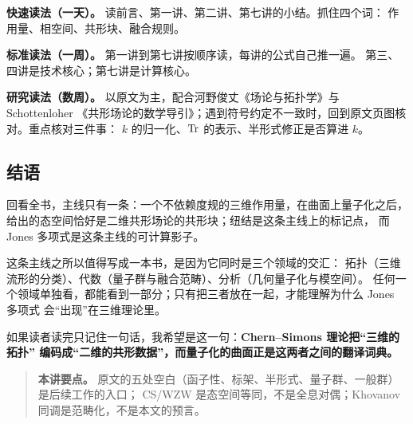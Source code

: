 \textbf{快速读法（一天）。} 读前言、第一讲、第二讲、第七讲的小结。抓住四个词：
作用量、相空间、共形块、融合规则。

\textbf{标准读法（一周）。} 第一讲到第七讲按顺序读，每讲的公式自己推一遍。
第三、四讲是技术核心；第七讲是计算核心。

\textbf{研究读法（数周）。} 以原文为主，配合河野俊丈《场论与拓扑学》与 Schottenloher
《共形场论的数学导引》；遇到符号约定不一致时，回到原文页图核对。重点核对三件事：
$k$ 的归一化、$\operatorname{Tr}$ 的表示、半形式修正是否算进 $k$。

\subsection{结语}

回看全书，主线只有一条：一个不依赖度规的三维作用量，在曲面上量子化之后，
给出的态空间恰好是二维共形场论的共形块；纽结是这条主线上的标记点，
而 Jones 多项式是这条主线的可计算影子。

这条主线之所以值得写成一本书，是因为它同时是三个领域的交汇：
拓扑（三维流形的分类）、代数（量子群与融合范畴）、分析（几何量子化与模空间）。
任何一个领域单独看，都能看到一部分；只有把三者放在一起，才能理解为什么 Jones 多项式
会“出现”在三维理论里。

如果读者读完只记住一句话，我希望是这一句：\textbf{Chern--Simons 理论把“三维的拓扑”
编码成“二维的共形数据”，而量子化的曲面正是这两者之间的翻译词典。}

\begin{quote}
\small
\textbf{本讲要点。} 原文的五处空白（函子性、标架、半形式、量子群、一般群）是后续工作的入口；
CS/WZW 是态空间等同，不是全息对偶；Khovanov 同调是范畴化，不是本文的预言。
\end{quote}

